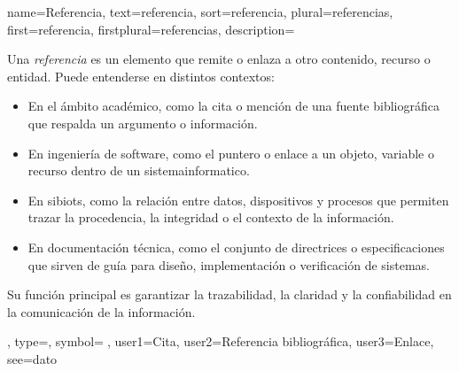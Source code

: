 	
	{
		name={Referencia},
		text={referencia},
		sort={referencia},
		plural={referencias},
		first={referencia},
		firstplural={referencias},
		description={Una \emph{referencia} es un elemento que remite o enlaza a otro contenido, recurso o entidad. Puede entenderse en distintos contextos:
			\begin{itemize}
				\item En el {\'a}mbito acad{\'e}mico, como la cita o menci{\'o}n de una fuente bibliogr{\'a}fica que respalda un argumento o informaci{\'o}n.
				\item En ingenier{\'i}a de software, como el puntero o enlace a un objeto, variable o recurso dentro de un \gls{sistemainformatico}.
				\item En \glspl{sibiot}, como la relaci{\'o}n entre \glspl{dato}, dispositivos y procesos que permiten trazar la procedencia, la integridad o el contexto de la informaci{\'o}n.
				\item En documentaci{\'o}n t{\'e}cnica, como el conjunto de directrices o especificaciones que sirven de gu{\'i}a para dise{\~n}o, implementaci{\'o}n o verificaci{\'o}n de sistemas.
			\end{itemize}
			Su funci{\'o}n principal es garantizar la trazabilidad, la claridad y la confiabilidad en la comunicaci{\'o}n de la informaci{\'o}n.},
		type=\glsdefaulttype,
		symbol={📑},
		user1={Cita},
		user2={Referencia bibliogr{\'a}fica},
		user3={Enlace},
		see={dato}
	}
	
